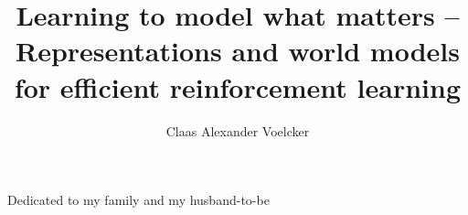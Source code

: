 \documentclass[11pt]{ut-thesis}
\author{Claas Alexander Voelcker}
\title{Learning to model what matters -- Representations and world models for efficient reinforcement learning}
\numberwithin{theorem}{subsection}
\numberwithin{assumption}{subsection}
\numberwithin{proposition}{subsection}
\numberwithin{inftheorem}{subsection}
\numberwithin{lemma}{subsection}
\numberwithin{corollary}{subsection}
\numberwithin{conjecture}{subsection}
\numberwithin{claim}{subsection}
\numberwithin{insight}{subsection}
\numberwithin{definition}{subsection}
\numberwithin{remark}{subsection}
\begin{document}
  \frontmatter
    \maketitle
    \begin{abstract}
      
    \end{abstract}
    \begin{dedication}
      Dedicated to my family and my husband-to-be
    \end{dedication}
    \begin{acknowledgements}
      
    \end{acknowledgements}
    \tableofcontents
    \listoftables
    \listoffigures
  \mainmatter
    
    
    
    
    
    
    
    
    
  \printbibliography[heading=bibintoc]
  \appendix
    
    
    
    
    
    
  \backmatter
\end{document}
